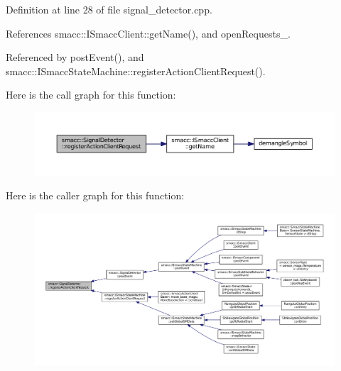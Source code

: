 Definition at line 28 of file signal\+\_\+detector.\+cpp.



References smacc\+::\+I\+Smacc\+Client\+::get\+Name(), and open\+Requests\+\_\+.



Referenced by post\+Event(), and smacc\+::\+I\+Smacc\+State\+Machine\+::register\+Action\+Client\+Request().




Here is the call graph for this function\+:
\nopagebreak
\begin{figure}[H]
\begin{center}
\leavevmode
\includegraphics[width=350pt]{classsmacc_1_1SignalDetector_a9a28cc1e9dcf7d204f3589fad8291bfd_cgraph}
\end{center}
\end{figure}




Here is the caller graph for this function\+:
\nopagebreak
\begin{figure}[H]
\begin{center}
\leavevmode
\includegraphics[width=350pt]{classsmacc_1_1SignalDetector_a9a28cc1e9dcf7d204f3589fad8291bfd_icgraph}
\end{center}
\end{figure}


